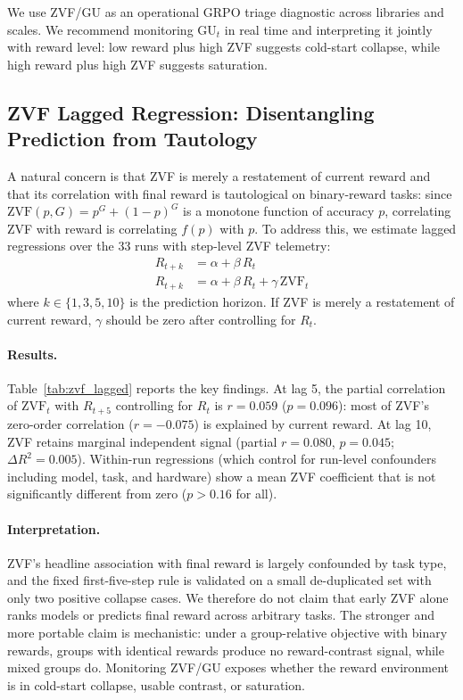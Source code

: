 We use ZVF/GU as an operational GRPO triage diagnostic across libraries and
scales. We recommend monitoring $\mathrm{GU}_t$ in real time and interpreting
it jointly with reward level: low reward plus high ZVF suggests cold-start
collapse, while high reward plus high ZVF suggests saturation.

\subsection{ZVF Lagged Regression: Disentangling Prediction from Tautology}
\label{sec:zvf-lagged}

A natural concern is that ZVF is merely a restatement of current reward and
that its correlation with final reward is tautological on binary-reward tasks:
since $\mathrm{ZVF}(p, G) = p^G + (1-p)^G$ is a
monotone function of accuracy $p$, correlating ZVF with reward is
correlating $f(p)$ with $p$.  To address this, we estimate lagged regressions
over the 33 runs with step-level ZVF telemetry:
\begin{align}
  R_{t+k} &= \alpha + \beta \, R_t \tag{M1} \\
  R_{t+k} &= \alpha + \beta \, R_t + \gamma \, \mathrm{ZVF}_t \tag{M2}
\end{align}
where $k \in \{1, 3, 5, 10\}$ is the prediction horizon.
If ZVF is merely a restatement of current reward, $\gamma$ should be zero after
controlling for $R_t$.

\paragraph{Results.}
Table~\ref{tab:zvf_lagged} reports the key findings.  At lag 5, the partial
correlation of $\mathrm{ZVF}_t$ with $R_{t+5}$ controlling for $R_t$ is
$r{=}0.059$ ($p{=}0.096$): most of ZVF's zero-order correlation ($r{=}{-}0.075$)
is explained by current reward.  At lag 10, ZVF retains marginal independent
signal (partial $r{=}0.080$, $p{=}0.045$; $\Delta R^2{=}0.005$).  Within-run
regressions (which control for run-level confounders including model, task, and
hardware) show a mean ZVF coefficient that is not significantly different from
zero ($p{>}0.16$ for all).

\paragraph{Interpretation.}
ZVF's headline association with final reward is largely confounded by task type,
and the fixed first-five-step rule is validated on a small de-duplicated set with only two
positive collapse cases.  We therefore do not claim that early ZVF alone ranks
models or predicts final reward across arbitrary tasks.  The stronger and more
portable claim is mechanistic: under a group-relative objective with binary
rewards, groups with identical rewards produce no reward-contrast signal, while
mixed groups do.  Monitoring ZVF/GU exposes whether the reward environment is in
cold-start collapse, usable contrast, or saturation.

